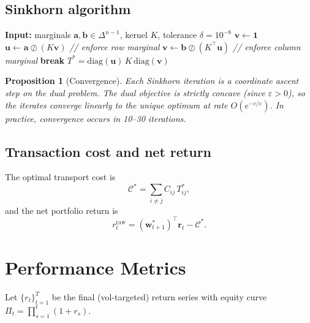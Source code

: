 \documentclass[11pt]{article}
\newtheorem{proposition}[theorem]{Proposition}
\newcommand{\diag}{\mathrm{diag}}
\newcommand{\bw}{\bm{w}}
\begin{document}
\subsection{Sinkhorn algorithm}

\begin{algorithm}[h]
\caption{Sinkhorn iterations}
\begin{algorithmic}[1]
\STATE \textbf{Input:} marginals $\bm{a},\bm{b}\in\Delta^{n-1}$, kernel $K$,
  tolerance $\delta=10^{-8}$
\STATE $\bm{v}\leftarrow\bm{1}$
  \STATE $\bm{u}\leftarrow \bm{a}\oslash(K\bm{v})$
  \hfill\textit{// enforce row marginal}
  \STATE $\bm{v}\leftarrow \bm{b}\oslash(K^\top\bm{u})$
  \hfill\textit{// enforce column marginal}
    \STATE \textbf{break}
  \ENDIF
\ENDFOR
\RETURN $T^*=\diag(\bm{u})\,K\,\diag(\bm{v})$
\end{algorithmic}
\end{algorithm}

\begin{proposition}[Convergence]
Each Sinkhorn iteration is a coordinate ascent step on the dual problem.
The dual objective is strictly concave (since $\varepsilon>0$), so the iterates
converge linearly to the unique optimum at rate $O(e^{-c/\varepsilon})$.
In practice, convergence occurs in 10--30 iterations.
\end{proposition}

\subsection{Transaction cost and net return}

The optimal transport cost is
\begin{equation}
\mathcal{C}^* = \sum_{i\neq j}C_{ij}\,T_{ij}^*,
\end{equation}
and the net portfolio return is
\begin{equation}
r_t^{\mathrm{raw}} = (\bw_{t+1}^*)^\top\bm{r}_t - \mathcal{C}^*.
\end{equation}

\section{Performance Metrics}\label{sec:metrics}

Let $\{r_t\}_{t=1}^T$ be the final (vol-targeted) return series with
equity curve $\Pi_t=\prod_{s=1}^t(1+r_s)$.
\end{document}
